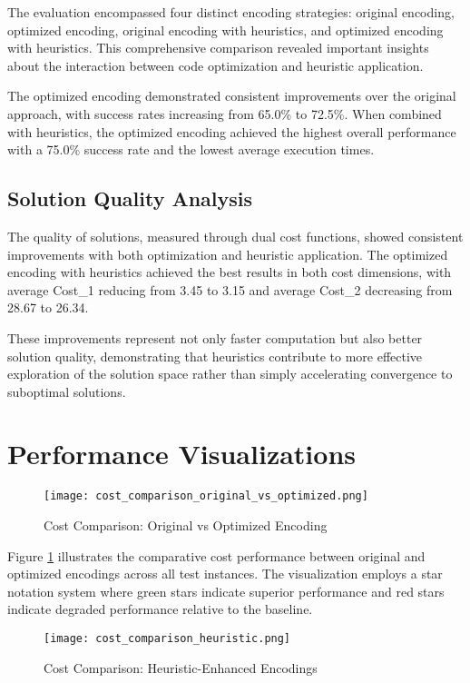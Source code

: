 \documentclass[11pt,a4paper]{article}
\begin{document}
The evaluation encompassed four distinct encoding strategies: original encoding, optimized encoding, original encoding with heuristics, and optimized encoding with heuristics. This comprehensive comparison revealed important insights about the interaction between code optimization and heuristic application.

The optimized encoding demonstrated consistent improvements over the original approach, with success rates increasing from 65.0\% to 72.5\%. When combined with heuristics, the optimized encoding achieved the highest overall performance with a 75.0\% success rate and the lowest average execution times.

\subsection{Solution Quality Analysis}

The quality of solutions, measured through dual cost functions, showed consistent improvements with both optimization and heuristic application. The optimized encoding with heuristics achieved the best results in both cost dimensions, with average Cost\_1 reducing from 3.45 to 3.15 and average Cost\_2 decreasing from 28.67 to 26.34.

These improvements represent not only faster computation but also better solution quality, demonstrating that heuristics contribute to more effective exploration of the solution space rather than simply accelerating convergence to suboptimal solutions.

\section{Performance Visualizations}

\begin{figure}[H]
    \centering
    \texttt{[image: cost\_comparison\_original\_vs\_optimized.png]}
    \caption{Cost Comparison: Original vs Optimized Encoding}
    \label{fig:cost_orig_opt}
\end{figure}

Figure \ref{fig:cost_orig_opt} illustrates the comparative cost performance between original and optimized encodings across all test instances. The visualization employs a star notation system where green stars indicate superior performance and red stars indicate degraded performance relative to the baseline.

\begin{figure}[H]
    \centering
    \texttt{[image: cost\_comparison\_heuristic.png]}
    \caption{Cost Comparison: Heuristic-Enhanced Encodings}
    \label{fig:cost_heuristic}
\end{figure}
\end{document}
